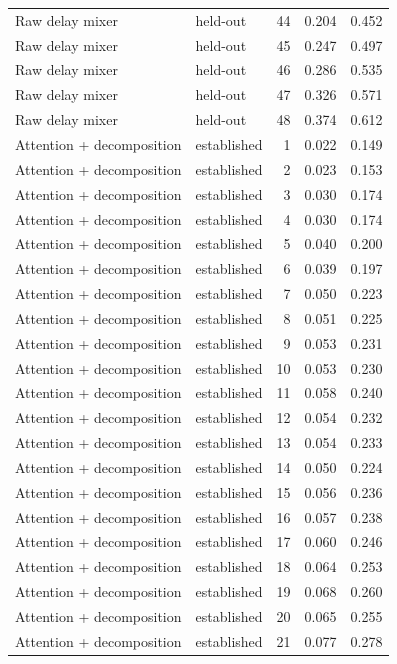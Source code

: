 \begin{tabular}{llrrr}
Raw delay mixer & held-out & 44 & 0.204 & 0.452 \\
Raw delay mixer & held-out & 45 & 0.247 & 0.497 \\
Raw delay mixer & held-out & 46 & 0.286 & 0.535 \\
Raw delay mixer & held-out & 47 & 0.326 & 0.571 \\
Raw delay mixer & held-out & 48 & 0.374 & 0.612 \\
Attention + decomposition & established & 1 & 0.022 & 0.149 \\
Attention + decomposition & established & 2 & 0.023 & 0.153 \\
Attention + decomposition & established & 3 & 0.030 & 0.174 \\
Attention + decomposition & established & 4 & 0.030 & 0.174 \\
Attention + decomposition & established & 5 & 0.040 & 0.200 \\
Attention + decomposition & established & 6 & 0.039 & 0.197 \\
Attention + decomposition & established & 7 & 0.050 & 0.223 \\
Attention + decomposition & established & 8 & 0.051 & 0.225 \\
Attention + decomposition & established & 9 & 0.053 & 0.231 \\
Attention + decomposition & established & 10 & 0.053 & 0.230 \\
Attention + decomposition & established & 11 & 0.058 & 0.240 \\
Attention + decomposition & established & 12 & 0.054 & 0.232 \\
Attention + decomposition & established & 13 & 0.054 & 0.233 \\
Attention + decomposition & established & 14 & 0.050 & 0.224 \\
Attention + decomposition & established & 15 & 0.056 & 0.236 \\
Attention + decomposition & established & 16 & 0.057 & 0.238 \\
Attention + decomposition & established & 17 & 0.060 & 0.246 \\
Attention + decomposition & established & 18 & 0.064 & 0.253 \\
Attention + decomposition & established & 19 & 0.068 & 0.260 \\
Attention + decomposition & established & 20 & 0.065 & 0.255 \\
Attention + decomposition & established & 21 & 0.077 & 0.278 \\

\end{tabular}
